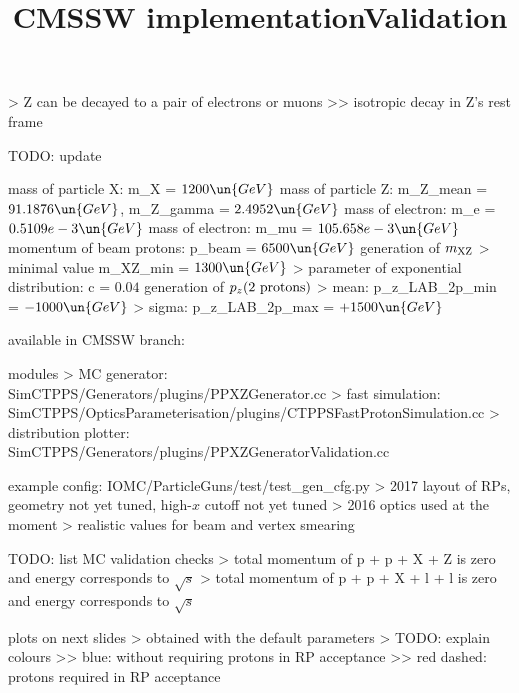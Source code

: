 \>> Z can be decayed to a pair of electrons or muons
\>>> isotropic decay in Z's rest frame


\newpage %

\> TODO: update

\> mass of particle X: m\_X = $1200\un{GeV}$
\> mass of particle Z: m\_Z\_mean = $91.1876\un{GeV}$, m\_Z\_gamma = $2.4952\un{GeV}$
\> mass of electron: m\_e = $0.5109e-3\un{GeV}$
\> mass of electron: m\_mu = $105.658e-3\un{GeV}$
\> momentum of beam protons: p\_beam = $6500\un{GeV}$
\> generation of $m_{\rm XZ}$
\>> minimal value m\_XZ\_min = $1300\un{GeV}$
\>> parameter of exponential distribution: c = $0.04$
\> generation of $p_z(\hbox{2 protons})$
\>> mean: p\_z\_LAB\_2p\_min = $-1000\un{GeV}$
\>> sigma: p\_z\_LAB\_2p\_max = $+1500\un{GeV}$


\newpage %
\title{CMSSW implementation}


\> available in CMSSW branch:\\ 

\NormalFonts

\> modules
\>> MC generator:\\ SimCTPPS/Generators/plugins/PPXZGenerator.cc
\>> fast simulation:\\ SimCTPPS/OpticsParameterisation/plugins/CTPPSFastProtonSimulation.cc
\>> distribution plotter:\\ SimCTPPS/Generators/plugins/PPXZGeneratorValidation.cc

\> example config: IOMC/ParticleGuns/test/test\_gen\_cfg.py
\>> 2017 layout of RPs, geometry not yet tuned, high-$x$ cutoff not yet tuned
\>> 2016 optics used at the moment
\>> realistic values for beam and vertex smearing


\newpage %
\title{Validation}

\> TODO: list MC validation checks
\>> total momentum of p + p + X + Z is zero and energy corresponds to $\sqrt s$
\>> total momentum of p + p + X + l + l is zero and energy corresponds to $\sqrt s$

\> plots on next slides
\>> obtained with the default parameters
\>> TODO: explain colours
\>>> blue: without requiring protons in RP acceptance
\>>> red dashed: protons required in RP acceptance


